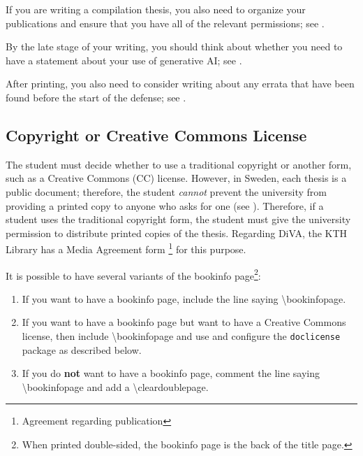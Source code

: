 \documentclass[12pt, twoside]{article}
\begin{document}
If you are writing a compilation thesis, you also need to organize your publications and ensure that you have all of the relevant permissions; see .

By the late stage of your writing, you should think about whether you need to have a statement about your use of generative AI; see .

After printing, you also need to consider writing about any errata that have been found before the start of the defense; see .

\subsection[Copyright or Creative Commons License]{Copyright or Creative Commons License}
\label{sec:cycle3copyrightOrCClicense}

The student must decide whether to use a traditional copyright or another form, such as a Creative Commons (CC) license. However, in Sweden, each thesis is a public document; therefore, the student \textit{cannot} prevent the university from providing a printed copy to anyone who asks for one (see ). Therefore, if a student uses the traditional copyright form, the student must give the university permission to distribute printed copies of the thesis. Regarding \gls{DiVA}, the \gls{KTH} Library has a Media Agreement form \footnote{Agreement regarding publication} for this purpose.

It is possible to have several variants of the bookinfo page\footnote{When printed double-sided, the bookinfo page is the back of the title page.}:
\begin{enumerate}[labelwidth =\widthof{\textbf{Creative Commons (CC)}}, leftmargin = !]
    \item[copyright] If you want to have a bookinfo page, include the line saying \textbackslash bookinfopage.
    \item[Creative Commons (CC)] If you want to have a bookinfo page but want to have a Creative Commons license, then include \textbackslash bookinfopage and use and configure the \texttt{doclicense} package as described below.
    \item[none] If you do \textbf{not} want to have a bookinfo page, comment the line saying \textbackslash bookinfopage and add a \textbackslash cleardoublepage.
\end{enumerate}
\end{document}
